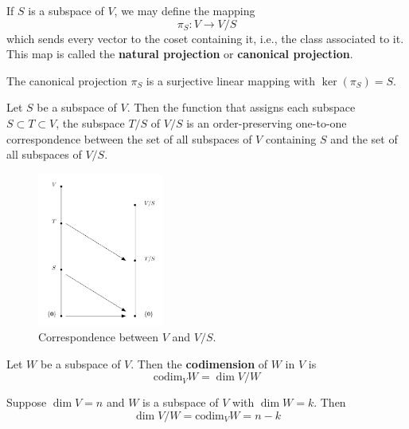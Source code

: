 \begin{definition}
	If $S$ is a subspace of $V$, we may define the mapping 
	\[
		\pi_S : V \longrightarrow V/S
	\]
	which sends every vector to the coset containing it, i.e., the class associated to it. This map is called the \textbf{natural projection} or \textbf{canonical projection}.
\end{definition}

\begin{theorem}
	The canonical projection $\pi_S$ is a surjective linear mapping with $\ker (\pi_S) = S$.
\end{theorem}

\begin{theorem}
	Let $S$ be a subspace of $V$. Then the function that assigns each subspace $S \subset T \subset V$, the subspace $T/S$ of $V/S$ is an order-preserving one-to-one correspondence between the set of all subspaces of $V$ containing $S$ and the set of all subspaces of $V/S$.
\end{theorem}

\begin{figure}[h]
	\centering
	  \includegraphics[width=0.37\textwidth]{Figures/correspondence_theorem.png} 
	  \caption{Correspondence between $V$ and $V/S$.}
	  \label{fig:correspondence-theorem}
\end{figure}

\begin{definition}[Codimension]
	Let $W$ be a subspace of $V$. Then the \textbf{codimension} of $W$ in $V$ is
	\[
		\text{codim}_V W = \dim V/W
	\]
\end{definition}

\begin{theorem}
	Suppose $\dim V = n$ and $W$ is a subspace of $V$ with $\dim W = k$. Then 
	\[
		\dim V/W = \text{codim}_V W = n-k
	\]
\end{theorem}


